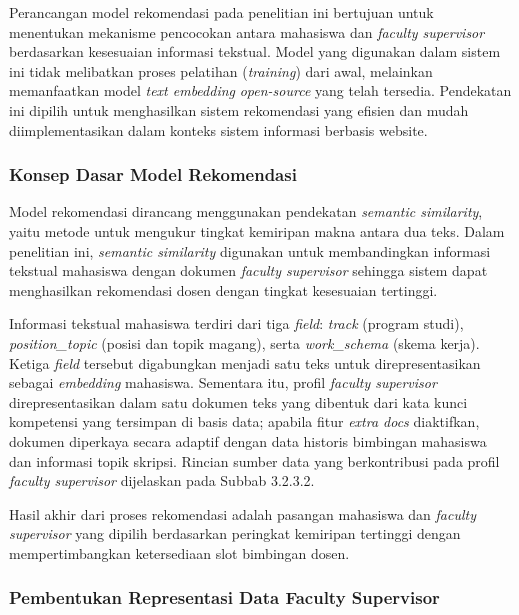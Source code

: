 Perancangan model rekomendasi pada penelitian ini bertujuan untuk menentukan mekanisme pencocokan antara mahasiswa dan \textit{faculty supervisor} berdasarkan kesesuaian informasi tekstual. Model yang digunakan dalam sistem ini tidak melibatkan proses pelatihan (\textit{training}) dari awal, melainkan memanfaatkan model \textit{text embedding} \textit{open-source} yang telah tersedia. Pendekatan ini dipilih untuk menghasilkan sistem rekomendasi yang efisien dan mudah diimplementasikan dalam konteks sistem informasi berbasis website.

\subsubsection{Konsep Dasar Model Rekomendasi}\label{konsep-dasar-model-rekomendasi}

Model rekomendasi dirancang menggunakan pendekatan \textit{semantic similarity}, yaitu metode untuk mengukur tingkat kemiripan makna antara dua teks. Dalam penelitian ini, \textit{semantic similarity} digunakan untuk membandingkan informasi tekstual mahasiswa dengan dokumen \textit{faculty supervisor} sehingga sistem dapat menghasilkan rekomendasi dosen dengan tingkat kesesuaian tertinggi.

Informasi tekstual mahasiswa terdiri dari tiga \textit{field}: \textit{track} (program studi), \textit{position\_topic} (posisi dan topik magang), serta \textit{work\_schema} (skema kerja). Ketiga \textit{field} tersebut digabungkan menjadi satu teks untuk direpresentasikan sebagai \textit{embedding} mahasiswa. Sementara itu, profil \textit{faculty supervisor} direpresentasikan dalam satu dokumen teks yang dibentuk dari kata kunci kompetensi yang tersimpan di basis data; apabila fitur \textit{extra docs} diaktifkan, dokumen diperkaya secara adaptif dengan data historis bimbingan mahasiswa dan informasi topik skripsi. Rincian sumber data yang berkontribusi pada profil \textit{faculty supervisor} dijelaskan pada Subbab 3.2.3.2.

Hasil akhir dari proses rekomendasi adalah pasangan mahasiswa dan \textit{faculty supervisor} yang dipilih berdasarkan peringkat kemiripan tertinggi dengan mempertimbangkan ketersediaan slot bimbingan dosen.

\subsubsection{Pembentukan Representasi Data Faculty Supervisor}\label{pembentukan-representasi-data-faculty-supervisor}

